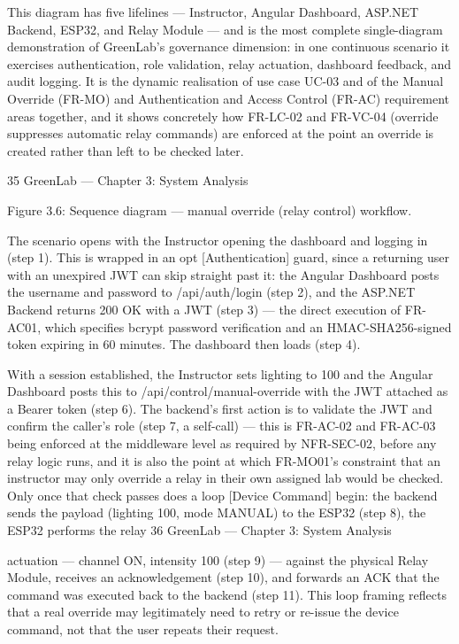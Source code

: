 This diagram has five lifelines --- Instructor, Angular Dashboard, ASP.NET Backend, ESP32, and
Relay Module --- and is the most complete single-diagram demonstration of GreenLab's
governance dimension: in one continuous scenario it exercises authentication, role validation, relay
actuation, dashboard feedback, and audit logging. It is the dynamic realisation of use case UC-03
and of the Manual Override (FR-MO) and Authentication and Access Control (FR-AC)
requirement areas together, and it shows concretely how FR-LC-02 and FR-VC-04 (override
suppresses automatic relay commands) are enforced at the point an override is created rather than
left to be checked later.




35
GreenLab --- Chapter 3: System Analysis




Figure 3.6: Sequence diagram --- manual override (relay control) workflow.

The scenario opens with the Instructor opening the dashboard and logging in (step 1). This is
wrapped in an opt [Authentication] guard, since a returning user with an unexpired JWT can skip
straight past it: the Angular Dashboard posts the username and password to /api/auth/login (step 2),
and the ASP.NET Backend returns 200 OK with a JWT (step 3) --- the direct execution of FR-AC01, which specifies bcrypt password verification and an HMAC-SHA256-signed token expiring in
60 minutes. The dashboard then loads (step 4).

With a session established, the Instructor sets lighting to 100%
and the Angular Dashboard posts this to /api/control/manual-override with the JWT attached as a
Bearer token (step 6). The backend's first action is to validate the JWT and confirm the caller's
role (step 7, a self-call) --- this is FR-AC-02 and FR-AC-03 being enforced at the middleware level
as required by NFR-SEC-02, before any relay logic runs, and it is also the point at which FR-MO01's constraint that an instructor may only override a relay in their own assigned lab would be
checked. Only once that check passes does a loop [Device Command] begin: the backend sends the
payload (lighting 100, mode MANUAL) to the ESP32 (step 8), the ESP32 performs the relay
36
GreenLab --- Chapter 3: System Analysis


actuation --- channel ON, intensity 100 (step 9) --- against the physical Relay Module, receives an
acknowledgement (step 10), and forwards an ACK that the command was executed back to the
backend (step 11). This loop framing reflects that a real override may legitimately need to retry or
re-issue the device command, not that the user repeats their request.

